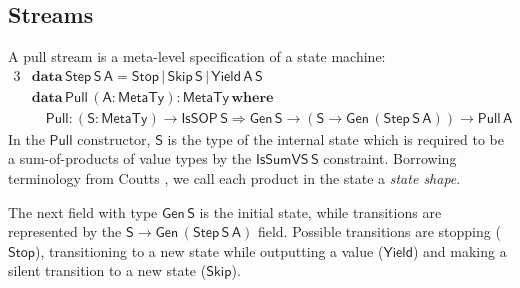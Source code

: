 \documentclass[acmsmall,screen,review,anonymous]{acmart}
\newcommand{\msf}[1]{{\mathsf{#1}}}
\newcommand{\mbf}[1]{{\mathbf{#1}}}
\newcommand{\ind}{\hspace{1em}}
\newcommand{\data}{\mbf{data}\,}
\newcommand{\where}{\mbf{where}}
\newcommand{\vA}{\mathsf{A}}
\newcommand{\vS}{\mathsf{S}}
\newcommand{\IsSOP}{\msf{IsSOP}}
\newcommand{\MTy}{\msf{MetaTy}}
\theoremstyle{remark}
\newcommand{\Gen}{\msf{Gen}}
\newcommand{\RA}{\Rightarrow}
\newcommand{\Stop}{\msf{Stop}}
\newcommand{\Skip}{\msf{Skip}}
\newcommand{\Yield}{\msf{Yield}}
\newcommand{\IsSumVS}{\msf{IsSumVS}}
\newcommand{\Step}{\msf{Step}}
\newcommand{\Pull}{\msf{Pull}}
\begin{document}
\subsection{Streams}

A pull stream is a meta-level specification of a state machine:
\begin{alignat*}{3}
  & \data \Step\,\vS\,\vA = \Stop\,|\,\Skip\,\vS\,|\,\Yield\,\vA\,\vS\\
  & \data \Pull\,(\vA : \MTy) : \MTy\,\where\\
  & \ind \Pull : (\vS : \MTy) \to \IsSOP\,\vS \RA \Gen\,\vS \to (\vS \to \Gen\,(\Step\,\vS\,\vA)) \to \Pull\,\vA
\end{alignat*}
In the $\Pull$ constructor, $\vS$ is the type of the internal state which is
required to be a sum-of-products of value types by the $\IsSumVS\,\vS$
constraint. Borrowing terminology from Coutts \cite{DBLP:phd/ethos/Coutts11}, we
call each product in the state a \emph{state shape}.

The next field with type $\Gen\,\vS$ is the initial state, while transitions
are represented by the $\vS \to \Gen\,(\Step\,\vS\,\vA)$ field. Possible transitions
are stopping ($\Stop$), transitioning to a new state while outputting a value
($\Yield$) and making a silent transition to a new state ($\Skip$).
\end{document}
